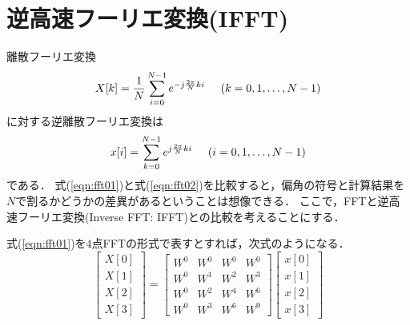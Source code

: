 \section{逆高速フーリエ変換(IFFT)}

離散フーリエ変換
\begin{equation}
X[k]=\frac{1}{N}\sum_{i=0}^{N-1}e^{-j\frac{2\pi}{N}ki} \hspace{5mm} (k=0,1,\ldots , N-1)
\label{eqn:fft01}
\end{equation}
に対する逆離散フーリエ変換は
\begin{equation}
x[i]=\sum_{k=0}^{N-1}e^{j\frac{2\pi}{N}ki} \hspace{5mm} (i=0,1,\ldots , N-1)
\label{eqn:fft02}
\end{equation}
である．
式(\ref{eqn:fft01})と式(\ref{eqn:fft02})を比較すると，偏角の符号と計算結果を$N$で割るかどうかの差異があるということは想像できる．
ここで，FFTと逆高速フーリエ変換(Inverse FFT: IFFT)との比較を考えることにする．

式(\ref{eqn:fft01})を4点FFTの形式で表すとすれば，次式のようになる．
\begin{equation}
\begin{bmatrix}
X[0] \\
X[1] \\
X[2] \\
X[3]
\end{bmatrix}
=
\begin{bmatrix}
W^0 & W^0 & W^0 & W^0 \\
W^0 & W^1 & W^2 & W^3 \\
W^0 & W^2 & W^4 & W^6 \\
W^0 & W^3 & W^6 & W^9
\end{bmatrix}
\begin{bmatrix}
x[0] \\
x[1] \\
x[2] \\
x[3]
\end{bmatrix}
\label{eqn:fft11}
\end{equation}

